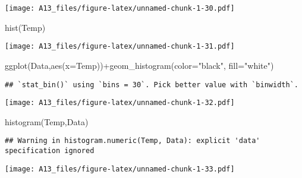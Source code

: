 \documentclass[
]{article}
\newenvironment{Shaded}{\begin{snugshade}}{\end{snugshade}}
\newcommand{\AttributeTok}[1]{\textcolor[rgb]{0.77,0.63,0.00}{#1}}
\newcommand{\FunctionTok}[1]{\textcolor[rgb]{0.00,0.00,0.00}{#1}}
\newcommand{\NormalTok}[1]{#1}
\newcommand{\SpecialCharTok}[1]{\textcolor[rgb]{0.00,0.00,0.00}{#1}}
\newcommand{\StringTok}[1]{\textcolor[rgb]{0.31,0.60,0.02}{#1}}
\begin{document}
\texttt{[image: A13\_files/figure-latex/unnamed-chunk-1-30.pdf]}

\begin{Shaded}
\begin{Highlighting}[]
\FunctionTok{hist}\NormalTok{(Temp)}
\end{Highlighting}
\end{Shaded}

\texttt{[image: A13\_files/figure-latex/unnamed-chunk-1-31.pdf]}

\begin{Shaded}
\begin{Highlighting}[]
\FunctionTok{ggplot}\NormalTok{(Data,}\FunctionTok{aes}\NormalTok{(}\AttributeTok{x=}\NormalTok{Temp))}\SpecialCharTok{+}\FunctionTok{geom\_histogram}\NormalTok{(}\AttributeTok{color=}\StringTok{"black"}\NormalTok{, }\AttributeTok{fill=}\StringTok{"white"}\NormalTok{)}
\end{Highlighting}
\end{Shaded}

\begin{verbatim}
## `stat_bin()` using `bins = 30`. Pick better value with `binwidth`.
\end{verbatim}

\texttt{[image: A13\_files/figure-latex/unnamed-chunk-1-32.pdf]}

\begin{Shaded}
\begin{Highlighting}[]
\FunctionTok{histogram}\NormalTok{(Temp,Data)}
\end{Highlighting}
\end{Shaded}

\begin{verbatim}
## Warning in histogram.numeric(Temp, Data): explicit 'data' specification ignored
\end{verbatim}

\texttt{[image: A13\_files/figure-latex/unnamed-chunk-1-33.pdf]}
\end{document}
